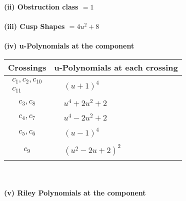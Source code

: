\documentclass[1p]{elsarticle_modified}
\theoremstyle{definition}
\begin{document}
\flushleft \textbf{(ii) Obstruction class $= 1$}\\~\\
\flushleft \textbf{(iii) Cusp Shapes $= 4 u^2+8$}\\~\\
\newpage\renewcommand{\arraystretch}{1}
\flushleft \textbf{(iv) u-Polynomials at the component}\newline \\
\begin{tabular}{m{50pt}|m{274pt}}
Crossings & \hspace{64pt}u-Polynomials at each crossing \\
\hline $$\begin{aligned}c_{1},c_{2},c_{10}\\c_{11}\end{aligned}$$&$\begin{aligned}
&(u+1)^4
\end{aligned}$\\
\hline $$\begin{aligned}c_{3},c_{8}\end{aligned}$$&$\begin{aligned}
&u^4+2 u^2+2
\end{aligned}$\\
\hline $$\begin{aligned}c_{4},c_{7}\end{aligned}$$&$\begin{aligned}
&u^4-2 u^2+2
\end{aligned}$\\
\hline $$\begin{aligned}c_{5},c_{6}\end{aligned}$$&$\begin{aligned}
&(u-1)^4
\end{aligned}$\\
\hline $$\begin{aligned}c_{9}\end{aligned}$$&$\begin{aligned}
&(u^2-2 u+2)^2
\end{aligned}$\\
\hline
\end{tabular}\\~\\
\newpage\renewcommand{\arraystretch}{1}
\flushleft \textbf{(v) Riley Polynomials at the component}\newline \\
\end{document}

